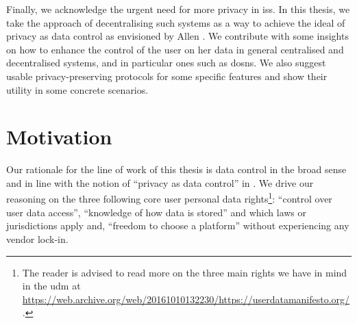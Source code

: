 \documentclass[showtrims,oldfontcommands]{kthesis}
\begin{document}
Finally, we acknowledge the urgent need for more privacy in \acp{is}. 
In this thesis, we take the approach of decentralising such systems as a way to 
achieve the ideal of privacy as data control as envisioned by Allen \cite{Allen99}. 
We contribute with some insights on how to enhance the control of the user on her 
data in general centralised and decentralised systems, and in particular ones such 
as \acp{dosn}. We also suggest usable privacy-preserving protocols for some specific 
features and show their utility in some concrete scenarios.

%
%
%
%
%
%
%

\section{Motivation}
    \label{section:motivation}
Our rationale for the line of work of this thesis is data control in the broad sense 
and in line with the notion of ``privacy as data control'' in \cite{Allen99}. We 
drive our reasoning on the three following core user personal data rights\footnote{The 
reader is advised to read more on the three main rights we have in mind in the \Ac{udm} 
at \url{https://web.archive.org/web/20161010132230/https://userdatamanifesto.org/}.}: 
``control over user data access'', ``knowledge of how data is stored'' and which 
laws or jurisdictions apply and, ``freedom to choose a platform'' without experiencing 
any vendor lock-in.

\end{document}
